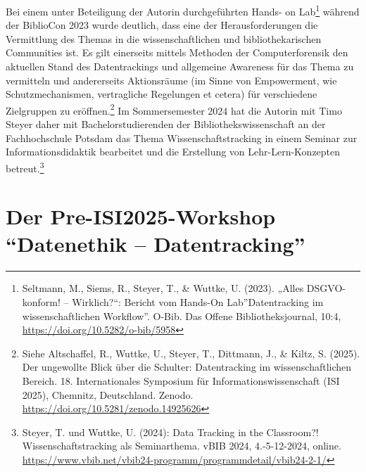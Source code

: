 \documentclass[a4paper,
fontsize=11pt,
oneside,
numbers=noperiodatend,
parskip=half-,
bibliography=totoc,
final
]{scrartcl}
\begin{document}
Bei einem unter Beteiligung der Autorin durchgeführten Hands- on
Lab\footnote{Seltmann, M., Siems, R., Steyer, T., \& Wuttke, U. (2023).
  „Alles DSGVO-konform! -- Wirklich?\enquote{: Bericht vom Hands-On
  Lab}Datentracking im wissenschaftlichen Workflow''. O-Bib. Das Offene
  Bibliotheksjournal, 10:4, \url{https://doi.org/10.5282/o-bib/5958}}
während der BiblioCon 2023 wurde deutlich, dass eine der
Herausforderungen die Vermittlung des Themas in die wissenschaftlichen
und bibliothekarischen Communities ist. Es gilt einerseits mittels
Methoden der Computerforensik den aktuellen Stand des Datentrackings und
allgemeine Awareness für das Thema zu vermitteln und andererseits
Aktionsräume (im Sinne von Empowerment, wie Schutzmechanismen,
vertragliche Regelungen et cetera) für verschiedene Zielgruppen zu
eröffnen.\footnote{Siehe Altschaffel, R., Wuttke, U., Steyer, T.,
  Dittmann, J., \& Kiltz, S. (2025). Der ungewollte Blick über die
  Schulter: Datentracking im wissenschaftlichen Bereich. 18.
  Internationales Symposium für Informationswissenschaft (ISI 2025),
  Chemnitz, Deutschland. Zenodo.
  \url{https://doi.org/10.5281/zenodo.14925626}} Im Sommersemester 2024
hat die Autorin mit Timo Steyer daher mit Bachelorstudierenden der
Bibliothekswissenschaft an der Fachhochschule Potsdam das Thema
Wissenschaftstracking in einem Seminar zur Informationsdidaktik
bearbeitet und die Erstellung von Lehr-Lern-Konzepten
betreut.\footnote{Steyer, T. und Wuttke, U. (2024): Data Tracking in the
  Classroom?! Wissenschaftstracking als Seminarthema. vBIB 2024,
  4.-5-12-2024, online.
  \url{https://www.vbib.net/vbib24-programm/programmdetail/vbib24-2-1/}}

\section{\texorpdfstring{Der Pre-ISI2025-Workshop
\enquote{Datenethik --
Datentracking}}{Der Pre-ISI2025-Workshop ``Datenethik -- Datentracking''}}\label{der-pre-isi2025-workshop-datenethik-datentracking}
\end{document}
